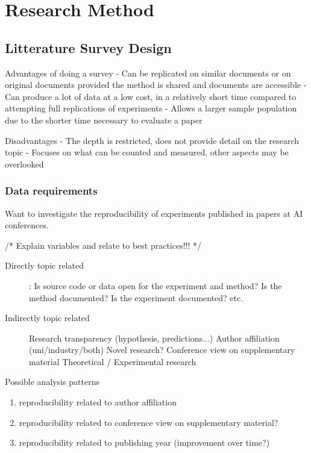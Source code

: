 
\chapter{Research Method}

\section{Litterature Survey Design}

Advantages of doing a survey
- Can be replicated on similar documents or on original documents provided the method is shared and documents are accessible
- Can produce a lot of data at a low cost, in a relatively short time compared to attempting full replications of experiments
- Allows a larger sample population due to the shorter time necessary to evaluate a paper

Disadvantages
- The depth is restricted, does not provide detail on the research topic
- Focuses on what can be counted and measured, other aspects may be overlooked

\subsection{Data requirements}
Want to investigate the reproducibility of experiments published in papers
at AI conferences.

/* Explain variables and relate to best practices!!! */
\begin{description}
\item[Directly topic related]:
        Is source code or data open for the experiment and method?
        Is the method documented?
        Is the experiment documented?
        etc.
\item[Indirectly topic related]
        Research transparency (hypothesis, predictions...)
        Author affiliation (uni/industry/both)
        Novel research?
        Conference view on supplementary material
        Theoretical / Experimental research

\end{description}

Possible analysis patterns
\begin{enumerate}
    \item reproducibility related to author affiliation
    \item reproducibility related to conference view on supplementary material?
    \item reproducibility related to publishing year (improvement over time?)

\end{enumerate}

